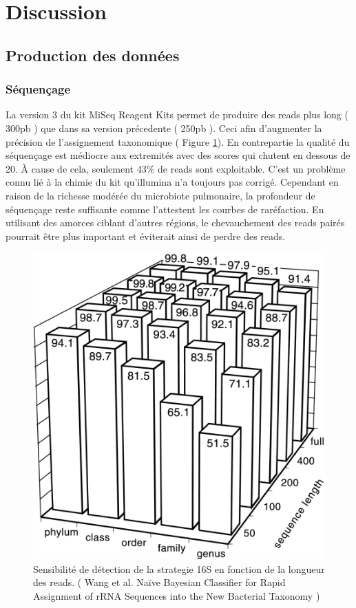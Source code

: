 \documentclass[12pt,a4paper]{article}
\begin{document}
\newpage
\section{Discussion}
\subsection{Production des données}
\subsubsection{Séquençage}
La version 3 du kit MiSeq Reagent Kits permet de produire des reads plus long ( 300pb ) que dans sa version précedente ( 250pb ). Ceci afin d'augmenter la précision de l'assignement taxonomique ( Figure \ref{rnasens}). En contrepartie la qualité du séquençage est médiocre aux extremités avec des scores qui chutent en dessous de 20. À cause de cela, seulement 43\% de reads sont exploitable. 
C'est un problème connu lié à la chimie du kit qu'illumina n'a toujours pas corrigé. Cependant en raison de la richesse modérée du microbiote pulmonaire, la profondeur de séquençage reste suffisante comme l'attestent les courbes de raréfaction. En utilisant des amorces ciblant d'autres régions, le chevauchement des reads pairés pourrait être plus important et éviterait ainsi de perdre des reads. 

\begin{figure}[t]
\begin{center}
\includegraphics[scale=3]{img/zam.jpg}\hfill
\end{center}
\caption{Sensibilité de détection de la strategie 16S en fonction de la longueur des reads. ( Wang et al. Naïve Bayesian Classifier for Rapid Assignment of rRNA Sequences into the New Bacterial Taxonomy ) }
\label{rnasens}
\end{figure}
\end{document}
